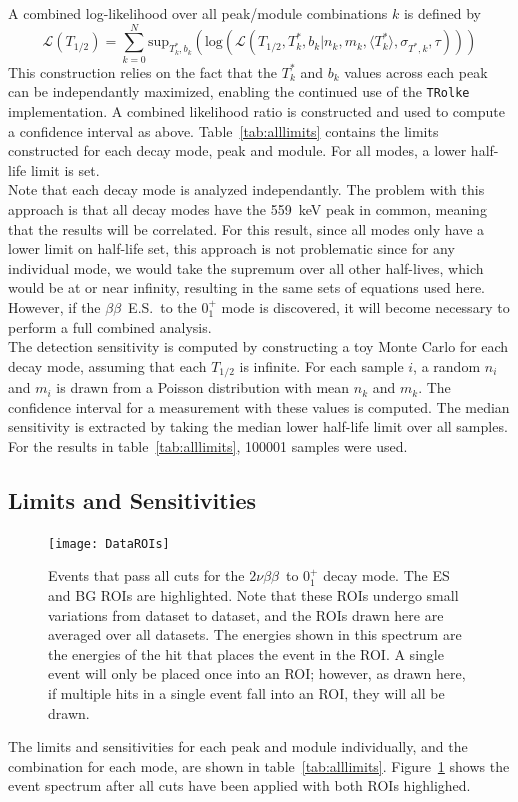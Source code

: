 \documentclass[notitlepage,rmp,aps,10pt]{revtex4-1}
\newcommand{\bb}{${\beta \beta}$}
\newcommand{\tnbb}{${2 \nu \beta \beta}$}
\newcommand{\bbes}{\bb~E.S.}
\newcommand{\SP}[3]{$#1^{#2}_{#3}$}
\begin{document}
A combined log-likelihood over all peak/module combinations $k$ is defined by
\begin{equation}
  \mathcal{L}(T_{1/2}) = \sum_{k=0}^{N} \mathrm{sup}_{T^*_k,b_k}(\mathrm{log}(\mathcal{L}(T_{1/2},T^*_k,b_k|n_k,m_k,\langle T^*_k\rangle, \sigma_{T^*,k},\tau)))
\end{equation}
This construction relies on the fact that the $T^*_k$ and $b_k$ values across each peak can be independantly maximized, enabling the continued use of the \texttt{TRolke} implementation.
A combined likelihood ratio is constructed and used to compute a confidence interval as above.
Table~\ref{tab:alllimits} contains the limits constructed for each decay mode, peak and module.
For all modes, a lower half-life limit is set.
\\
Note that each decay mode is analyzed independantly.
The problem with this approach is that all decay modes have the 559~keV peak in common, meaning that the results will be correlated.
For this result, since all modes only have a lower limit on half-life set, this approach is not problematic since for any individual mode, we would take the supremum over all other half-lives, which would be at or near infinity, resulting in the same sets of equations used here.
However, if the \bbes\ to the \SP{0}{+}{1} mode is discovered, it will become necessary to perform a full combined analysis.
\\
The detection sensitivity is computed by constructing a toy Monte Carlo for each decay mode, assuming that each $T_{1/2}$ is infinite.
For each sample $i$, a random $n_i$ and $m_i$ is drawn from a Poisson distribution with mean $n_k$ and $m_k$.
The confidence interval for a measurement with these values is computed.
The median sensitivity is extracted by taking the median lower half-life limit over all samples.
For the results in table~\ref{tab:alllimits}, 100001 samples were used.
\\
\subsection{Limits and Sensitivities}
\begin{figure}[h]
  \centering
  \texttt{[image: DataROIs]}
  \caption[Measured events after all cuts with ROIs drawn]{\label{fig:roievents}
    Events that pass all cuts for the \tnbb\ to \SP{0}{+}{1} decay mode. The ES and BG ROIs are highlighted. Note that these ROIs undergo small variations from dataset to dataset, and the ROIs drawn here are averaged over all datasets. The energies shown in this spectrum are the energies of the hit that places the event in the ROI. A single event will only be placed once into an ROI; however, as drawn here, if multiple hits in a single event fall into an ROI, they will all be drawn.
  }
\end{figure}
The limits and sensitivities for each peak and module individually, and the combination for each mode, are shown in table~\ref{tab:alllimits}.
Figure~\ref{fig:roievents} shows the event spectrum after all cuts have been applied with both ROIs highlighed.
\end{document}
